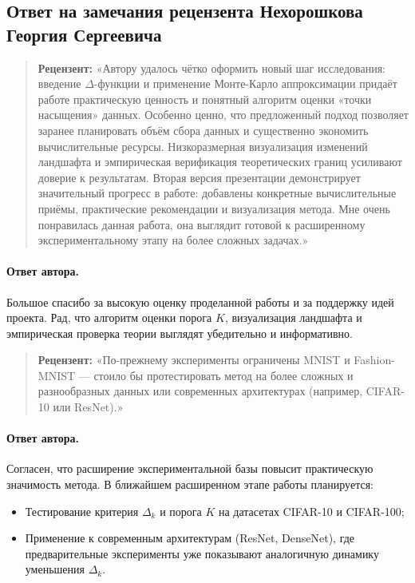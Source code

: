 \documentclass[11pt]{article}
\begin{document}
\pagestyle{empty}

\begin{center}
    \subsection*{Ответ на замечания рецензента Нехорошкова Георгия Сергеевича}
\end{center}

\begin{quote}
    \textbf{Рецензент:}
    «Автору удалось чётко оформить новый шаг исследования: введение $\Delta$-функции и применение Монте-Карло аппроксимации
    придаёт работе практическую ценность и понятный алгоритм оценки «точки насыщения» данных. Особенно ценно, что
    предложенный подход позволяет заранее планировать объём сбора данных и существенно экономить вычислительные ресурсы.
    Низкоразмерная визуализация изменений ландшафта и эмпирическая верификация теоретических границ усиливают доверие к
    результатам. Вторая версия презентации демонстрирует значительный прогресс в работе: добавлены конкретные вычислительные
    приёмы, практические рекомендации и визуализация метода. Мне очень понравилась данная работа, она выглядит готовой к
    расширенному экспериментальному этапу на более сложных задачах.»
\end{quote}

\paragraph{Ответ автора.}
Большое спасибо за высокую оценку проделанной работы и за поддержку идей проекта. Рад, что алгоритм оценки порога \(K\), визуализация ландшафта и эмпирическая проверка теории выглядят убедительно и информативно.


\begin{quote}
    \textbf{Рецензент:}
    «По-прежнему эксперименты ограничены MNIST и Fashion-MNIST — стоило бы протестировать метод на более сложных и разнообразных данных или современных архитектурах (например, CIFAR-10 или ResNet).»
\end{quote}

\paragraph{Ответ автора.}
Согласен, что расширение экспериментальной базы повысит практическую значимость метода. В ближайшем расширенном этапе работы планируется:
\begin{itemize}
    \item Тестирование критерия \(\Delta_k\) и порога \(K\) на датасетах CIFAR-10 и CIFAR-100;
    \item Применение к современным архитектурам (ResNet, DenseNet), где предварительные эксперименты уже показывают аналогичную динамику уменьшения \(\Delta_k\).
\end{itemize}
\end{document}
